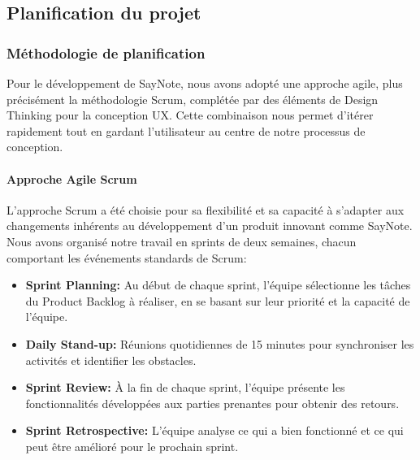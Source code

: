 

    
    \subsection{Planification du projet}
    
    \subsubsection{Méthodologie de planification}
    
    Pour le développement de SayNote, nous avons adopté une approche agile, plus précisément la méthodologie Scrum, complétée par des éléments de Design Thinking pour la conception UX. Cette combinaison nous permet d'itérer rapidement tout en gardant l'utilisateur au centre de notre processus de conception.
    
    \paragraph{Approche Agile Scrum}
    
    L'approche Scrum a été choisie pour sa flexibilité et sa capacité à s'adapter aux changements inhérents au développement d'un produit innovant comme SayNote. Nous avons organisé notre travail en sprints de deux semaines, chacun comportant les événements standards de Scrum:
    
    \begin{itemize}
        \item \textbf{Sprint Planning:} Au début de chaque sprint, l'équipe sélectionne les tâches du Product Backlog à réaliser, en se basant sur leur priorité et la capacité de l'équipe.
        
        \item \textbf{Daily Stand-up:} Réunions quotidiennes de 15 minutes pour synchroniser les activités et identifier les obstacles.
        
        \item \textbf{Sprint Review:} À la fin de chaque sprint, l'équipe présente les fonctionnalités développées aux parties prenantes pour obtenir des retours.
        
        \item \textbf{Sprint Retrospective:} L'équipe analyse ce qui a bien fonctionné et ce qui peut être amélioré pour le prochain sprint.
    \end{itemize}
    
